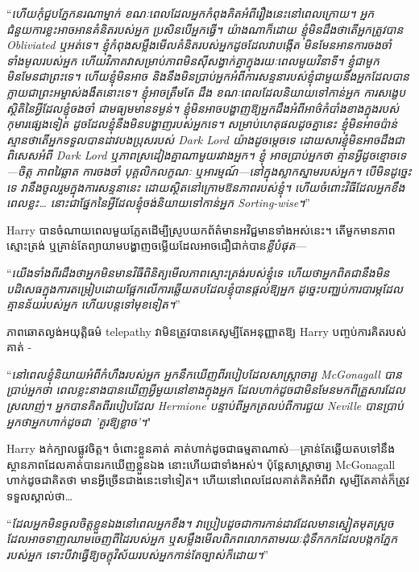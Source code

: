 {{“\emph{ហើយកុំជួបភ្នែកនរណាម្នាក់ ខណៈពេលដែលអ្នកកំពុងគិតអំពីរឿងនេះនៅពេលក្រោយ។ អ្នកជំនួយការខ្លះអាចអានគំនិតរបស់អ្នក ប្រសិនបើអ្នកធ្វើ។ យ៉ាង​ណា​ក៏​ដោយ ខ្ញុំ​មិន​ដឹង​ថា​តើ​អ្នក​ត្រូវ​បាន​ Obliviated ឬ​អត់​ទេ។ ខ្ញុំកំពុងសម្លឹងមើលគំនិតរបស់អ្នកដូចដែលវាបង្កើត មិនមែនអានការចងចាំទាំងមូលរបស់អ្នក ហើយវិភាគវាសម្រាប់ភាពមិនស៊ីសង្វាក់គ្នាក្នុងរយៈពេលមួយវិនាទី។ ខ្ញុំជាមួក មិនមែនជាព្រះទេ។ ហើយខ្ញុំមិនអាច និងនឹងមិនប្រាប់អ្នកអំពីការសន្ទនារបស់ខ្ញុំជាមួយនឹងអ្នកដែលបានក្លាយជាព្រះអម្ចាស់ងងឹតនោះទេ។ ខ្ញុំអាចត្រឹមតែ \emph{ដឹង} ខណៈពេលដែលនិយាយទៅកាន់អ្នក ការសង្ខេបស្ថិតិនៃអ្វីដែលខ្ញុំចងចាំ ជាមធ្យមមានទម្ងន់។ ខ្ញុំ\emph{មិនអាច}បង្ហាញឱ្យអ្នកដឹងអំពីអាថ៌កំបាំងខាងក្នុងរបស់កុមារផ្សេងទៀត ដូចដែលខ្ញុំនឹងមិនបង្ហាញរបស់អ្នកទេ។ សម្រាប់ហេតុផលដូចគ្នានេះ ខ្ញុំមិនអាចប៉ាន់ស្មានថាតើអ្នកទទួលបានដាវបងប្រុសរបស់ Dark Lord យ៉ាងដូចម្តេចទេ ដោយសារខ្ញុំមិនអាចដឹងជាពិសេសអំពី Dark Lord ឬភាពស្រដៀងគ្នាណាមួយរវាងអ្នក។ ខ្ញុំ \emph{អាច}ប្រាប់អ្នកថា គ្មានអ្វីដូចខ្មោចទេ—ចិត្ត ភាពវៃឆ្លាត ការចងចាំ បុគ្គលិកលក្ខណៈ ឬអារម្មណ៍—នៅក្នុងស្លាកស្នាមរបស់អ្នក។ បើមិនដូច្នេះទេ វានឹងចូលរួមក្នុងការសន្ទនានេះ ដោយស្ថិតនៅក្រោមឱនភាពរបស់ខ្ញុំ។ ហើយចំពោះវិធីដែលអ្នកខឹងពេលខ្លះ… នោះជាផ្នែកនៃអ្វីដែលខ្ញុំចង់និយាយទៅកាន់អ្នក Sorting-wise។}”

Harry បានចំណាយពេលមួយភ្លែតដើម្បីស្រូបយកព័ត៌មានអវិជ្ជមានទាំងអស់នេះ។ តើមួកមានភាពស្មោះត្រង់ ឬគ្រាន់តែព្យាយាមបង្ហាញចម្លើយដែលអាចជឿជាក់បាន\emph{ខ្លីបំផុត}—

“\emph{យើងទាំងពីរដឹងថាអ្នកមិនមានវិធីពិនិត្យមើលភាពស្មោះត្រង់របស់ខ្ញុំទេ ហើយថាអ្នកពិតជានឹងមិនបដិសេធក្នុងការតម្រៀបដោយផ្អែកលើការឆ្លើយតបដែលខ្ញុំបានផ្តល់ឱ្យអ្នក ដូច្នេះបញ្ឈប់ការបារម្ភដែលគ្មានន័យរបស់អ្នក ហើយបន្តទៅមុខទៀត។}”

ភាពឆោតល្ងង់អយុត្តិធម៌ telepathy វាមិនត្រូវបានគេសូម្បីតែអនុញ្ញាតឱ្យ Harry បញ្ចប់ការគិតរបស់គាត់ -

“\emph{នៅពេលខ្ញុំនិយាយអំពីកំហឹងរបស់អ្នក អ្នកនឹកឃើញពីរបៀបដែលសាស្រ្តាចារ្យ McGonagall បានប្រាប់អ្នកថា ពេលខ្លះនាងបានឃើញអ្វីមួយនៅខាងក្នុងអ្នក ដែលហាក់ដូចជាមិនមែនមកពីគ្រួសារដែលស្រលាញ់។ អ្នកបានគិតពីរបៀបដែល Hermione បន្ទាប់ពីអ្នកត្រលប់ពីការជួយ Neville បានប្រាប់អ្នកថាអ្នកហាក់ដូចជា 'គួរឱ្យខ្លាច'។}"

Harry ងក់ក្បាលផ្លូវចិត្ត។ ចំពោះខ្លួនគាត់ គាត់ហាក់ដូចជាធម្មតាណាស់—គ្រាន់តែឆ្លើយតបទៅនឹងស្ថានភាពដែលគាត់បានរកឃើញខ្លួនឯង នោះហើយជាទាំងអស់។ ប៉ុន្តែ​សាស្ត្រាចារ្យ McGonagall ហាក់​ដូច​ជា​គិត​ថា មាន​អ្វី​ច្រើន​ជាង​នេះ​ទៅ​ទៀត។ ហើយនៅពេលដែលគាត់គិតអំពីវា សូម្បីតែគាត់ក៏ត្រូវទទួលស្គាល់ថា…

“\emph{ដែលអ្នកមិនចូលចិត្តខ្លួនឯងនៅពេលអ្នកខឹង។ វាប្រៀបដូចជាការកាន់ដាវដែលមានស្នៀតមុតស្រួច ដែលអាចទាញឈាមចេញពីដៃរបស់អ្នក ឬសម្លឹងមើលពិភពលោកតាមរយៈដុំទឹកកកដែលបង្កកភ្នែករបស់អ្នក ទោះបីវាធ្វើឱ្យចក្ខុវិស័យរបស់អ្នកកាន់តែច្បាស់ក៏ដោយ។}”

}}
